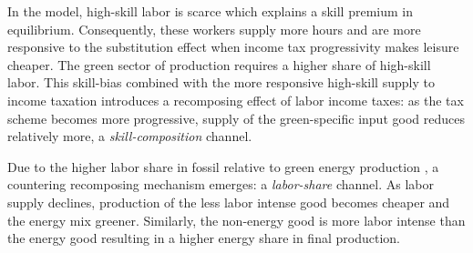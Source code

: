
In the model, high-skill labor is scarce which explains a skill premium in equilibrium. Consequently, these workers supply more hours and are more responsive to the substitution effect when income tax progressivity makes leisure cheaper.
The green sector of production requires a higher share of high-skill labor. This skill-bias combined with the more responsive high-skill supply to income taxation introduces a recomposing effect of labor income taxes: as the tax scheme becomes more progressive, supply of the green-specific input good reduces relatively more, a \textit{skill-composition} channel.

Due to the higher labor share in fossil relative to green energy production \citep{Fried2018ClimateAnalysis}, a countering recomposing mechanism emerges: a \textit{labor-share} channel. As labor supply declines, production of the less labor intense good becomes cheaper and the energy mix greener. Similarly, the non-energy good is more labor intense than the energy good resulting in a higher energy share in final production. 

	\begin{comment}
content...
Directed technical change amplifies or mitigates this recomposing effect of the income tax. The market size effect renders research in the sector with the larger input market more profitable, whereas the price effect increases demand for scientists in the sector with the relatively scarcer good. Since the two energy goods are substitutes, previous research suggests that the market effect dominates and research is directed towards the sector with the bigger input market, that is, the fossil sector. 
As regards final good production, energy and non-energy goods are complements so that the price effect is expected to dominate and the recomposition towards high-skill supply should boost research in energy goods relative to non-energy goods.\footnote{\ For a discussion of these two mechanisms compare \cite{Acemoglu2002DirectedChange, Loebbing2019NationalChange, Hemous2021DirectedEconomics}.

	\end{comment}


